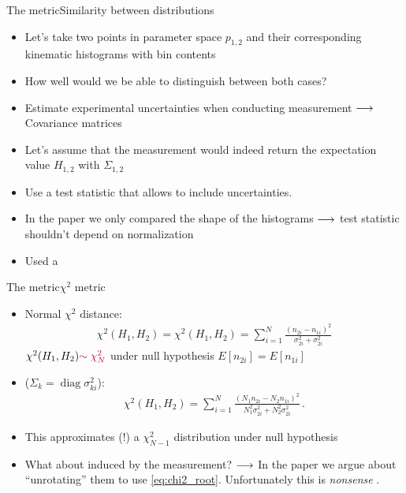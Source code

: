 \begin{frame}{The metric}{Similarity between distributions}
	\begin{itemize}
		\item Let's take two points in parameter space $p_{1,2}$ and their corresponding kinematic histograms  with bin contents 
		\item How well would we be able to distinguish between both cases?
		\item Estimate experimental uncertainties when conducting measurement  $\longrightarrow$ Covariance matrices  
		\item Let's assume that the measurement would indeed return the expectation value $H_{1,2}$ with $\Sigma_{1,2}$
		\item Use a test statistic that allows to include uncertainties.  
		\item In the paper we only compared the shape of the histograms $\longrightarrow$ test statistic shouldn't depend on normalization
		\item Used a  	
	\end{itemize}
\end{frame}

\begin{frame}{The metric}{$\chi^2$ metric}
	\begin{itemize}
		\item Normal $\chi^2$ distance: 
		\begin{align}
		\chi^2(H_1, H_2) = \chi^2(H_1, H_2) = \sum_{i=1}^N \frac{(n_{2i}-n_{1i})^2}{\sigma_{2i}^2+\sigma_{2i}^2}
		\label{eq:chi2_nonorm}
		\end{align}
		$\chi^2(H_1,H_2){\color{purple}\sim \chi^2_N}$ under null hypothesis $E[n_{2i}]=E[n_{1i}]$
		\item {} ($\Sigma_k = \operatorname{diag}\sigma_{ki}^2$):
		\begin{align}
		  \chi^2(H_1, H_2) = \sum_{i=1}^N \frac{(N_1n_{2i}-N_2n_{1i})^2}{N_1^2\sigma_{2i}^2+N_2^2\sigma_{2i}^2}\,.
		  \label{eq:chi2_root}
		\end{align}
		\item This approximates (!) a $\chi^2_{N-1}$ distribution under null hypothesis 
		\item What about  induced by the measurement? $\longrightarrow$ In the paper we argue about \enquote{unrotating} them to use \eqref{eq:chi2_root}. Unfortunately this is \emph{nonsense} . 
	\end{itemize}
\end{frame}

